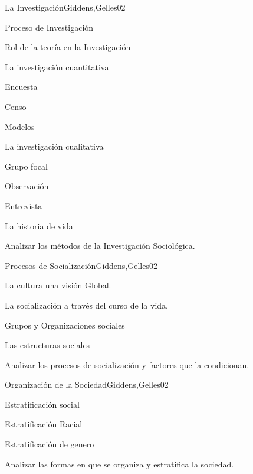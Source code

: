 \begin{syllabus}
\begin{unit}{La Investigación}{Giddens,Gelles}{0}{2}
    \begin{topics}
      \item Proceso de Investigación
      \item Rol de la teoría en la Investigación
      \item La investigación cuantitativa
      \item Encuesta
      \item Censo
      \item Modelos
      \item La investigación cualitativa
      \item Grupo focal
      \item Observación
      \item Entrevista
      \item La historia de vida
    \end{topics}
    \begin{unitgoals}
      \item Analizar los métodos de la Investigación Sociológica.
    \end{unitgoals}
\end{unit}

\begin{unit}{Procesos de Socialización}{Giddens,Gelles}{0}{2}
    \begin{topics}
      \item La cultura una visión Global.
      \item La socialización a través del curso de la vida.
      \item Grupos y Organizaciones sociales
      \item Las estructuras sociales
    \end{topics}
    \begin{unitgoals}
      \item Analizar los procesos de socialización y factores que la condicionan.
    \end{unitgoals}
\end{unit}

\begin{unit}{Organización de la Sociedad}{Giddens,Gelles}{0}{2}
    \begin{topics}
      \item Estratificación social
      \item Estratificación Racial
      \item Estratificación de genero
    \end{topics}
    \begin{unitgoals}
      \item Analizar las formas en que se organiza y estratifica la sociedad.
    \end{unitgoals}
\end{unit}


\end{syllabus}
